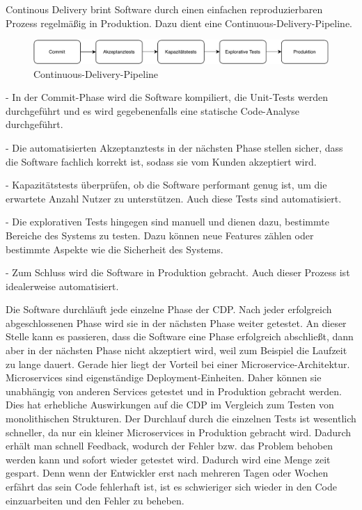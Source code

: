 Continous Delivery brint Software durch einen einfachen reproduzierbaren Prozess regelmäßig in Produktion. Dazu dient eine Continuous-Delivery-Pipeline.

\begin{figure}[bth]
    \centering
    \includegraphics[width=1.0\textwidth]{Chapters/Bilder/CDP.pdf}
    \caption{Continuous-Delivery-Pipeline}
   \label{fig:cdp}
  \end{figure}

\begin{description}
	\item - In der Commit-Phase wird die Software kompiliert, die Unit-Tests werden durchgeführt und es wird gegebenenfalls eine statische Code-Analyse durchgeführt.
	\item - Die automatisierten Akzeptanztests in der nächsten Phase stellen sicher, dass die Software fachlich korrekt ist, sodass sie vom Kunden akzeptiert wird.
	\item - Kapazitätstests überprüfen, ob die Software performant genug ist, um die erwartete Anzahl Nutzer zu unterstützen. Auch diese Tests sind automatisiert.
	\item - Die explorativen Tests hingegen sind manuell und dienen dazu, bestimmte Bereiche des Systems zu testen. Dazu können neue Features zählen oder bestimmte Aspekte wie die Sicherheit des Systems.
	\item - Zum Schluss wird die Software in Produktion gebracht. Auch dieser Prozess ist idealerweise automatisiert.
\end{description}
\newpage
Die Software durchläuft jede einzelne Phase der CDP. Nach jeder erfolgreich abgeschlossenen Phase wird sie in der nächsten Phase weiter getestet. An dieser Stelle kann es passieren, dass die Software eine Phase erfolgreich abschließt, dann aber in der nächsten Phase nicht akzeptiert wird, weil zum Beispiel die Laufzeit zu lange dauert.\newline
Gerade hier liegt der Vorteil bei einer Microservice-Architektur. Microservices sind eigenständige Deployment-Einheiten. Daher können sie unabhängig von anderen Services getestet und in Produktion gebracht werden. Dies hat erhebliche Auswirkungen auf die CDP im Vergleich zum Testen von monolithischen Strukturen.
Der Durchlauf durch die einzelnen Tests ist wesentlich schneller, da nur ein kleiner Microservices in Produktion gebracht wird. Dadurch erhält man schnell Feedback, wodurch der Fehler bzw. das Problem behoben werden kann und sofort wieder getestet wird. Dadurch wird eine Menge zeit gespart. Denn wenn der Entwickler erst nach mehreren Tagen oder Wochen erfährt das sein Code fehlerhaft ist, ist es schwieriger sich wieder in den Code einzuarbeiten und den Fehler zu beheben.\newline
